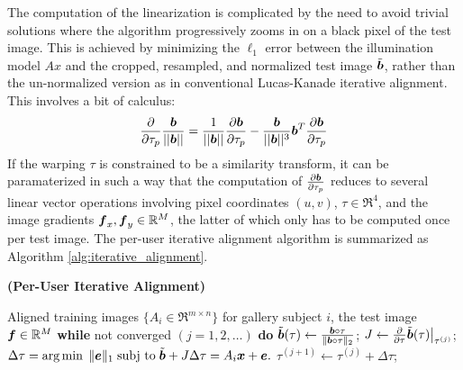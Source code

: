 \documentclass[10pt,twocolumn,letterpaper]{article}
\begin{document}
The computation of the linearization is complicated by the need to avoid trivial 
solutions where the algorithm
progressively zooms in on a black pixel of the test image.
This is achieved by minimizing the $\ell_1$ error between the illumination model $Ax$ and the cropped,
resampled, and normalized test image $\tilde{{\boldsymbol{b}}}$, rather than the un-normalized version as in 
conventional Lucas-Kanade iterative alignment.
This involves a bit of calculus:
\begin{equation}
\frac{\partial}{\partial \tau_p} \frac{{\boldsymbol{b}}}{||{\boldsymbol{b}}||} 
= \frac{1}{||{\boldsymbol{b}}||} \frac{\partial {\boldsymbol{b}}}{\partial \tau_p} - 
\frac{{\boldsymbol{b}}}{||{\boldsymbol{b}}||^3} {\boldsymbol{b}}^T \frac{\partial {\boldsymbol{b}}}{\partial \tau_p}
\end{equation}
If the warping $\tau$ is constrained to be a similarity transform,
it can be paramaterized in such a way that the computation of $\frac{\partial {\boldsymbol{b}}}{\partial \tau_p}$
reduces to several linear vector operations involving pixel coordinates $(u,v)$, $\tau \in \Re^4$,
and the image gradients $\boldsymbol{f}_x, \boldsymbol{f}_y \in {\mathbb{R}}^M$, the latter of which only has to be computed
once per test image.  The per-user iterative alignment algorithm is summarized as Algorithm \eqref{alg:iterative_alignment}.
\begin{algorithm}[thb]
\caption{\bf (Per-User Iterative Alignment)} \label{alg:iterative_alignment}
\begin{algorithmic}[1]
\begin{small}
 Aligned training images $\{A_i \in \Re^{m\times n}\}$ for gallery subject $i$, the test image
$\boldsymbol{f}\in{\mathbb{R}}^M$ 
\STATE \hspace{0mm} {\bf while} not converged $(j=1,2,\ldots)$ {\bf do} 
\STATE \hspace{3mm} $\tilde {{\boldsymbol{b}}}(\tau) \leftarrow \frac{{\boldsymbol{b}} \circ \tau}{\|{\boldsymbol{b}} \circ \tau\|_2}$;
\STATE \hspace{3mm} $J \leftarrow  \frac{\partial}{\partial \tau} \tilde{{\boldsymbol{b}}}(\tau)  \bigr|_{\tau^{(j)}} $;
\STATE \hspace{3mm} $\Delta \tau =  \arg\min \; \| \boldsymbol{e} \|_1  \; \textup{subj to} \; \tilde {{\boldsymbol{b}}} + J \Delta \tau = A_i {\boldsymbol{x}} + \boldsymbol{e}.$ 
\STATE \hspace{3mm} $\tau^{(j+1)} \leftarrow \tau^{(j)} + \Delta
\tau$; 
\end{small}
\end{algorithmic}
\end{algorithm}
\end{document}

